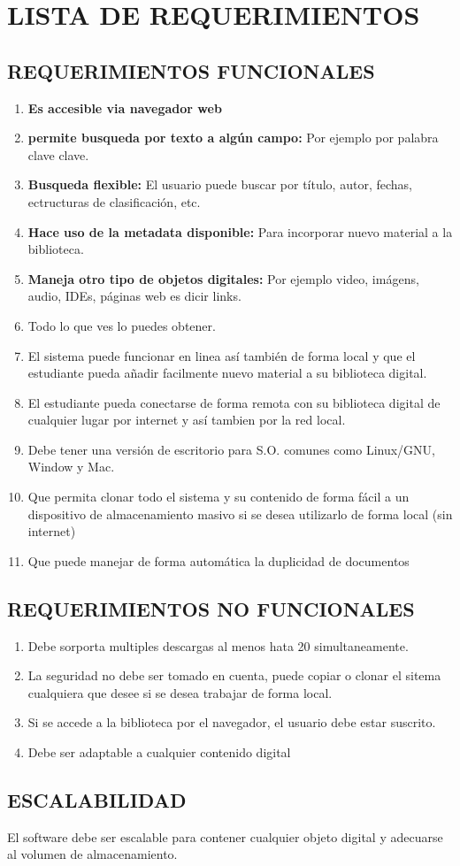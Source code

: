\chapter{LISTA DE REQUERIMIENTOS}
\section{REQUERIMIENTOS FUNCIONALES}
\begin{enumerate}
	\item \textbf{Es accesible via navegador web}
	\item \textbf{permite busqueda por texto a algún campo: }Por ejemplo por palabra clave clave.
	\item \textbf{Busqueda flexible:} El usuario puede buscar por título, autor, fechas, ectructuras de clasificación, etc. 
	\item \textbf{Hace uso de la metadata disponible: } Para incorporar nuevo material a la biblioteca. 
	\item \textbf{Maneja otro tipo de objetos digitales: } Por ejemplo video, imágens, audio, IDEs, páginas web es dicir links.
	\item Todo lo que ves lo puedes obtener.
	\item El sistema puede funcionar en linea así también de forma local y que el estudiante pueda añadir facilmente nuevo material a su biblioteca digital. 
	\item El estudiante pueda conectarse de forma remota con su biblioteca digital de cualquier lugar por internet y así tambien por la red local. 
	\item Debe tener una versión de escritorio para S.O. comunes como Linux/GNU, Window y Mac. 
	\item Que permita clonar todo el sistema y su contenido de forma fácil a un dispositivo de almacenamiento masivo si se desea utilizarlo de forma local (sin internet)
	\item Que puede manejar  de forma automática  la duplicidad de documentos
\end{enumerate}

\section{REQUERIMIENTOS NO FUNCIONALES}
\begin{enumerate}
	\item Debe sorporta multiples descargas al menos hata 20 simultaneamente. 
	\item La seguridad no debe ser tomado en cuenta, puede copiar o clonar el sitema cualquiera que desee si se desea trabajar de forma local. 
	\item Si se accede a la biblioteca por el navegador, el usuario debe estar suscrito. 
	\item Debe ser adaptable a cualquier contenido digital
\end{enumerate}
\section{ESCALABILIDAD} El software debe ser escalable para contener cualquier objeto digital y adecuarse al volumen de almacenamiento.